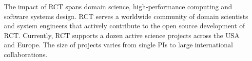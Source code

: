 \documentclass[preprint,12pt, a4paper]{elsarticle}
\begin{document}



The impact of RCT spans domain science, high-performance computing and software
systems design. RCT serves a worldwide community of domain scientists and system
engineers that actively contribute to the open source development of RCT\@.
Currently, RCT supports a dozen active science projects across the USA and
Europe. The size of projects varies from single PIs to large international
collaborations.
\end{document}
